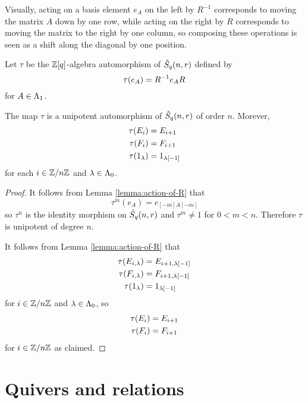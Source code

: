 \documentclass[a4paper, 11pt, twoside]{report}
\begin{document}
Visually, acting on a basis element $e_A$ on the left by $R^{-1}$ corresponds to moving the matrix $A$ down by one row, while acting on the right by $R$ corresponds to moving the matrix to the right by one column, so composing these operations is seen as a shift along the diagonal by one position.

Let $\tau$ be the $\mathbb{Z}[q]$-algebra automorphism of $\hat{S}_q(n,r)$ defined by
\begin{equation*}
\tau{(e_A)} = R^{-1}e_A R
\end{equation*}
for $A\in\Lambda_1{}$.

\begin{lemma}\label{lemma:conjugation-by-R}
The map $\tau$ is a unipotent automorphism of $\hat{S}_q(n,r)$ of order $n$. Morever,
\begin{align*}
\tau{(E_i)} &= E_{i+1}\\
\tau{(F_i)} &= F_{i+1}\\
\tau{(1_\lambda)} &= 1_{\lambda[-1]}
\end{align*}
for each $i\in\mathbb{Z}/{n \mathbb{Z}}$ and $\lambda\in\Lambda_0{}$.
\end{lemma}

\begin{proof}
It follows from Lemma \ref{lemma:action-of-R} that
\begin{equation*}
\tau^m{(e_A)} = e_{[-m]A[-m]}
\end{equation*}
so $\tau^n$ is the identity morphism on $\hat{S}_q(n,r)$ and $\tau^m\neq 1$ for $0<m<n$. Therefore $\tau$ is unipotent of degree $n$.

It follows from Lemma \ref{lemma:action-of-R} that
\begin{align*}
\tau{(E_{i,\lambda})} &= E_{i+1,\lambda[-1]}\\
\tau{(F_{i,\lambda})} &= F_{i+1,\lambda[-1]}\\
\tau{(1_\lambda)} &= 1_{\lambda[-1]}
\end{align*}
for $i\in\mathbb{Z}/{n \mathbb{Z}}$ and $\lambda\in\Lambda_0{}$, so
\begin{align*}
\tau{(E_i)} &= E_{i+1}\\
\tau{(F_i)} &= F_{i+1}
\end{align*}
for $i\in\mathbb{Z}/{n \mathbb{Z}}$ as claimed.
\end{proof}


\section{Quivers and relations}
\end{document}

